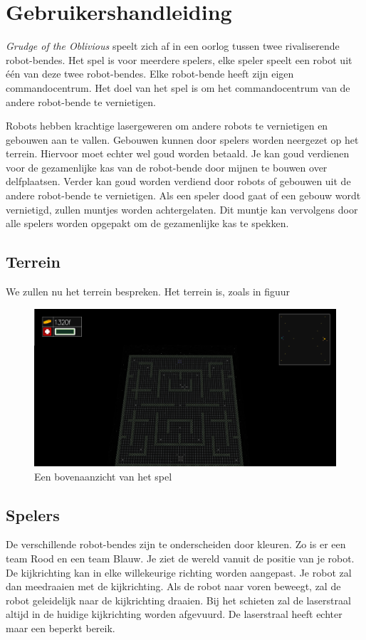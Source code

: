     \section{Gebruikershandleiding}
    \label{app:handleiding}
    \emph{Grudge of the Oblivious} speelt zich af in een oorlog tussen twee rivaliserende robot-bendes. Het spel is voor meerdere spelers, elke speler speelt een robot uit \'e\'en van deze twee robot-bendes. Elke robot-bende heeft zijn eigen commandocentrum. Het doel van het spel is om het commandocentrum van de andere robot-bende te vernietigen. 
    
    Robots hebben krachtige lasergeweren om andere robots te vernietigen en gebouwen aan te vallen. Gebouwen kunnen door spelers worden neergezet op het terrein. Hiervoor moet echter wel goud worden betaald. Je kan goud verdienen voor de gezamenlijke kas van de robot-bende door mijnen te bouwen over delfplaatsen. Verder kan goud worden verdiend door robots of gebouwen uit de andere robot-bende te vernietigen. Als een speler dood gaat of een gebouw wordt vernietigd, zullen muntjes worden achtergelaten. Dit muntje kan vervolgens door alle spelers worden opgepakt om de gezamenlijke kas te spekken.

	\subsection{Terrein}
    We zullen nu het terrein bespreken. Het terrein is, zoals in figuur \
    
    \begin{figure}[h]
        \centering
    	\includegraphics[width=\textwidth]{kaart.png}
	\caption{Een bovenaanzicht van het spel}
    \end{figure}
    
    \subsection{Spelers}
    De verschillende robot-bendes zijn te onderscheiden door kleuren. Zo is er een team Rood en een team Blauw. Je ziet de wereld vanuit de positie van je robot. De kijkrichting kan in elke willekeurige richting worden aangepast. Je robot zal dan meedraaien met de kijkrichting. Als de robot naar voren beweegt, zal de robot geleidelijk naar de kijkrichting draaien. Bij het schieten zal de laserstraal altijd in de huidige kijkrichting worden afgevuurd. De laserstraal heeft echter maar een beperkt bereik.
    

